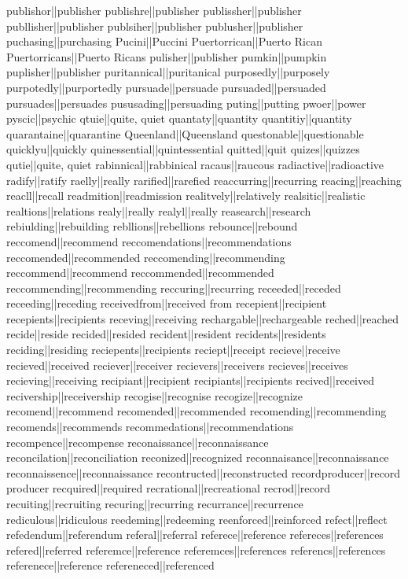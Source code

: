 publishor||publisher
publishre||publisher
publissher||publisher
publlisher||publisher
publsiher||publisher
publusher||publisher
puchasing||purchasing
Pucini||Puccini
Puertorrican||Puerto Rican
Puertorricans||Puerto Ricans
pulisher||publisher
pumkin||pumpkin
puplisher||publisher
puritannical||puritanical
purposedly||purposely
purpotedly||purportedly
pursuade||persuade
pursuaded||persuaded
pursuades||persuades
pususading||persuading
puting||putting
pwoer||power
pyscic||psychic
qtuie||quite, quiet
quantaty||quantity
quantitiy||quantity
quarantaine||quarantine
Queenland||Queensland
questonable||questionable
quicklyu||quickly
quinessential||quintessential
quitted||quit
quizes||quizzes
qutie||quite, quiet
rabinnical||rabbinical
racaus||raucous
radiactive||radioactive
radify||ratify
raelly||really
rarified||rarefied
reaccurring||recurring
reacing||reaching
reacll||recall
readmition||readmission
realitvely||relatively
realsitic||realistic
realtions||relations
realy||really
realyl||really
reasearch||research
rebiulding||rebuilding
rebllions||rebellions
rebounce||rebound
reccomend||recommend
reccomendations||recommendations
reccomended||recommended
reccomending||recommending
reccommend||recommend
reccommended||recommended
reccommending||recommending
reccuring||recurring
receeded||receded
receeding||receding
receivedfrom||received from
recepient||recipient
recepients||recipients
receving||receiving
rechargable||rechargeable
reched||reached
recide||reside
recided||resided
recident||resident
recidents||residents
reciding||residing
reciepents||recipients
reciept||receipt
recieve||receive
recieved||received
reciever||receiver
recievers||receivers
recieves||receives
recieving||receiving
recipiant||recipient
recipiants||recipients
recived||received
recivership||receivership
recogise||recognise
recogize||recognize
recomend||recommend
recomended||recommended
recomending||recommending
recomends||recommends
recommedations||recommendations
recompence||recompense
reconaissance||reconnaissance
reconcilation||reconciliation
reconized||recognized
reconnaisance||reconnaissance
reconnaissence||reconnaissance
recontructed||reconstructed
recordproducer||record producer
recquired||required
recrational||recreational
recrod||record
recuiting||recruiting
recuring||recurring
recurrance||recurrence
rediculous||ridiculous
reedeming||redeeming
reenforced||reinforced
refect||reflect
refedendum||referendum
referal||referral
referece||reference
refereces||references
refered||referred
referemce||reference
referemces||references
referencs||references
referenece||reference
refereneced||referenced
